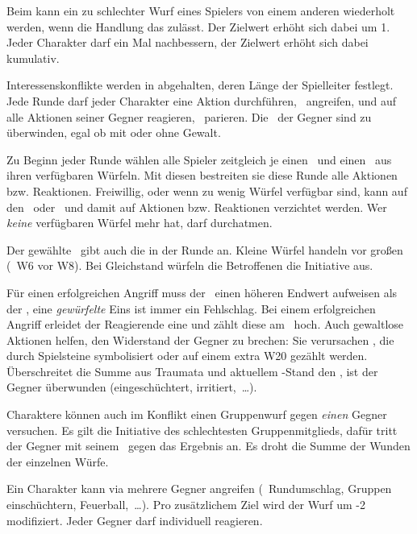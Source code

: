 \begin{multicols}{2}
Beim  kann ein zu schlechter Wurf eines Spielers von einem anderen wiederholt werden, wenn die Handlung das zulässt. Der Zielwert erhöht sich dabei um 1. Jeder Charakter darf ein Mal nachbessern, der Zielwert erhöht sich dabei kumulativ. 


Interessenskonflikte werden in  abgehalten, deren Länge der Spielleiter festlegt. Jede Runde darf jeder Charakter eine Aktion durchführen, \zB\ angreifen, und auf alle Aktionen seiner Gegner reagieren, \zB\ parieren. Die \WW\ der Gegner sind zu überwinden, egal ob mit oder ohne Gewalt.

Zu Beginn jeder Runde wählen alle Spieler zeitgleich je einen  \AW\ und einen  \RW\ aus ihren verfügbaren Würfeln. Mit diesen bestreiten sie diese Runde alle Aktionen bzw. Reaktionen. Freiwillig, oder wenn zu wenig Würfel verfügbar sind, kann auf den \AW\ oder \RW\ und damit auf Aktionen bzw. Reaktionen verzichtet werden. Wer \emph{keine} verfügbaren Würfel mehr hat, darf durchatmen.

Der gewählte \AW\ gibt auch die  in der Runde an. Kleine Würfel handeln vor großen (\zB\ W6 vor W8). Bei Gleichstand würfeln die Betroffenen die Initiative aus.

Für einen erfolgreichen Angriff muss der \AW\ einen höheren Endwert aufweisen als der \RW, eine \emph{gewürfelte} Eins ist immer ein Fehlschlag. Bei einem erfolgreichen Angriff erleidet der Reagierende eine  und zählt diese am \WW\ hoch. Auch gewaltlose Aktionen helfen, den Widerstand der Gegner zu brechen: Sie verursachen , die durch Spielsteine symbolisiert oder auf einem extra W20 gezählt werden. Überschreitet die Summe aus Traumata und aktuellem \WW-Stand den \WW, ist der Gegner überwunden (eingeschüchtert, irritiert,~\ldots). 

Charaktere können auch im Konflikt einen Gruppenwurf gegen \emph{einen} Gegner versuchen. Es gilt die Initiative des schlechtesten Gruppenmitglieds, dafür tritt der Gegner mit seinem \RW\ gegen das Ergebnis an. Es droht die Summe der Wunden der einzelnen Würfe.

Ein Charakter kann via  mehrere Gegner angreifen (\zB\ Rundumschlag, Gruppen einschüchtern, Feuerball,~\ldots). Pro zusätzlichem Ziel wird der Wurf um -2 modifiziert. Jeder Gegner darf individuell reagieren.


\end{multicols}
